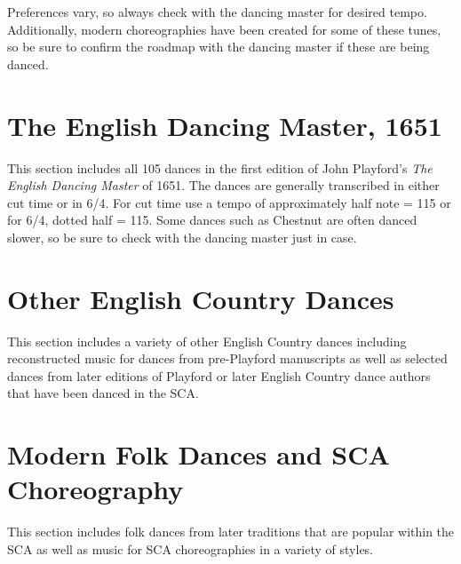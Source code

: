 \documentclass[11pt]{book}
\begin{document}
Preferences vary, so always check with the dancing master for desired tempo.
Additionally, modern choreographies have been created for some of these tunes,
so be sure to confirm the roadmap with the dancing master if these are being
danced.

\clearpage


\chapter{The English Dancing Master, 1651}

This section includes all 105 dances in the first edition of John Playford's
{\em The English Dancing Master} of 1651.  The dances are generally transcribed
in either cut time or in 6/4. For cut time use a tempo of approximately half
note = 115 or for 6/4, dotted half = 115.  Some dances such as Chestnut are
often danced slower, so be sure to check with the dancing master just in case.

\clearpage


\chapter{Other English Country Dances}

This section includes a variety of other English Country dances including
reconstructed music for dances from pre-Playford manuscripts as well as
selected dances from later editions of Playford or later English Country dance
authors that have been danced in the SCA.

\clearpage


\chapter{Modern Folk Dances and SCA Choreography}

This section includes folk dances from later traditions that are popular within
the SCA as well as music for SCA choreographies in a variety of styles.

\clearpage


\clearpage

\printindex
\end{document}
